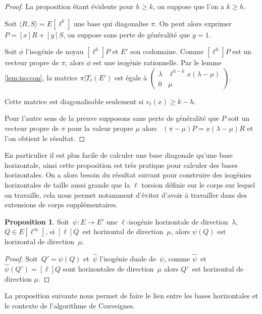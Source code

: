 \documentclass[10pt,a4paper]{book}
\theoremstyle{plain}
\theoremstyle{definition}
\theoremstyle{definition}
\theoremstyle{definition}
\newtheorem{prop}[thm]{Proposition}
\theoremstyle{definition}
\theoremstyle{remark}
\theoremstyle{remark}
\theoremstyle{definition}
\begin{document}
\begin{proof}
La proposition étant évidente pour $h \geqslant k$,
on suppose que l'on a $k \geqslant h$.

Soit $\langle R,S \rangle =E[\ell^k]$ une base qui diagonalise $\pi$.
On peut alors exprimer $P=[x]R+[y]S$, on suppose sans perte de généralité
que $y=1$.

Soit $\phi$ l'isogénie de noyau $[\ell^h]P$ et $E'$ son codomaine.
Comme $[\ell^h]P$ est un vecteur propre de $\pi$, alors $\phi$ est une isogénie
rationnelle. Par le lemme \ref{lem:iso:con}, la matrice $\pi|T_{\ell}(E')$
 est égale à $\left ( \begin{smallmatrix}\lambda& \ell^{h-k} x (\lambda-\mu)\\ 0&\mu
\end{smallmatrix}\right )$.  

Cette matrice est diagonalisable seulement si $v_{\ell}(x) \geqslant k - h$.

Pour l'autre sens de la preuve supposons sans perte de généralité que $P$ soit 
un vecteur propre de $\pi$ pour la valeur propre $\mu$ alors 
~$(\pi - \mu) P = x (\lambda - \mu) R$ et l'on obtient le résultat.
\end{proof}

En particulier il est plus facile de calculer une base diagonale qu'une base horizontale, ainsi cette proposition est très pratique pour calculer des bases horizontales. On a alors besoin du résultat suivant pour construire des isogénies horizontales de taille aussi grande que la $\ell$ torsion définie sur le corps sur lequel on travaille, cela nous permet notamment d'éviter d'avoir à travailler dans des extensions de corps supplémentaires.

\begin{prop}\label{pro:pus:hor}
Soit~$\psi: E \rightarrow E'$ une $\ell$-isogénie horizontale de direction~$\lambda$,
$Q \in E[\ell^{\infty}]$,
si $[\ell] Q$~est horizontal de direction~$\mu$,
alors $\psi(Q)$ est horizontal de direction~$\mu$.
\end{prop}
\begin{proof}
Soit~$Q' = \psi(Q)$ et~$\widehat{\psi}$ l'isogénie duale de~$\psi$, 
comme $\widehat{\psi}$~et~$\widehat{\psi}(Q') = [\ell]Q$ sont horizontales
de direction~$\mu$ alors $Q'$~est horizontal de direction $\mu$.
\end{proof}

La proposition suivante nous permet de faire le lien entre les bases horizontales et le contexte de l'algorithme de Couveignes.
\end{document}

